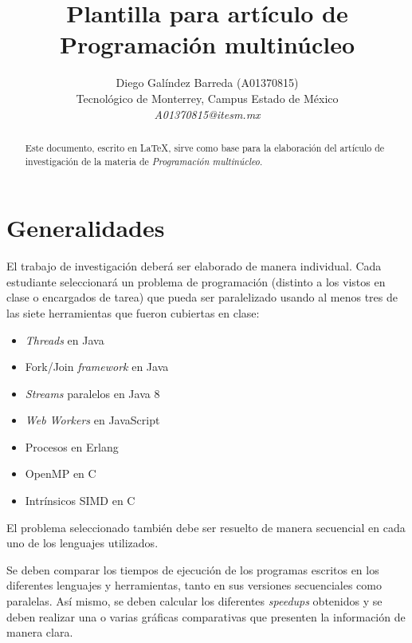 \documentclass[10pt,letterpaper,oneside]{article}
\begin{document}
\renewcommand\abstractname{Resumen}
\renewcommand\refname{Referencias}
\renewcommand{\notesname}{Notas}

\title{Plantilla para artículo de Programación multinúcleo}
\author{
\Large Diego Galíndez Barreda (A01370815)
\\
Tecnológico de Monterrey, Campus Estado de México
\\  
\Large \textit{A01370815@itesm.mx}}  

\maketitle

\begin{abstract}
Este documento, escrito en \LaTeX, sirve como base para la elaboración del artículo de investigación de la materia de \textit{Programación multinúcleo}. 
\end{abstract}

\section{Generalidades}

El trabajo de investigación deberá ser elaborado de manera individual. Cada estudiante seleccionará un problema de programación (distinto a los vistos en clase o encargados de tarea) que pueda ser paralelizado usando al menos tres de las siete herramientas que fueron cubiertas en clase:
    
\begin{itemize}
    \item \textit{Threads} en Java 
    \item Fork/Join \textit{framework} en Java
    \item \textit{Streams} paralelos en Java 8
    \item \textit{Web Workers} en JavaScript
    \item Procesos en Erlang    
    \item OpenMP en C       
    \item Intrínsicos SIMD en C
\end{itemize}

El problema seleccionado también debe ser resuelto de manera secuencial en cada uno de los lenguajes utilizados. 

Se deben comparar los tiempos de ejecución de los programas escritos en los diferentes lenguajes y herramientas, tanto en sus versiones secuenciales como paralelas. Así mismo, se deben calcular los diferentes \textit{speedups} obtenidos y se deben realizar una o varias gráficas comparativas que presenten la información de manera clara.   
\end{document}
